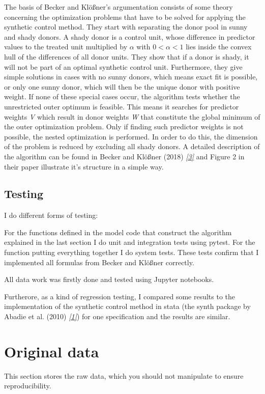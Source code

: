 \documentclass[a4paper,11pt,english]{sphinxmanual}
\begin{document}
The basis of Becker and Klößner's argumentation consists of some theory concerning the optimization problems that have to be solved for applying the synthetic control method. They start with separating the donor pool in sunny and shady donors. A shady donor is a control unit, whose difference in predictor values to the treated unit multiplied by \(\alpha\) with \(0<\alpha<1\) lies inside the convex hull of the differences of all donor units. They show that if a donor is shady, it will not be part of an optimal synthetic control unit. Furthermore, they give simple solutions in cases with no sunny donors, which means exact fit is possible, or only one sunny donor, which will then be the unique donor with positive weight. If none of these special cases occur, the algorithm tests whether the unrestricted outer optimum is feasible. This means it searches for predictor weights \emph{V} which result in donor weights \emph{W} that constitute the global minimum of the outer optimization problem. Only if finding such predictor weights is not possible, the nested optimization is performed. In order to do this, the dimension of the problem is reduced by excluding all shady donors. A detailed description of the algorithm can be found in Becker and Klößner (2018) \label{introduction:id9}{\hyperref[references:becker2018]{\emph{{[}3{]}}}} and Figure 2 in their paper illustrate it's structure in a simple way.


\section{Testing}
\label{introduction:testing}
I do different forms of testing:

For the functions defined in the model code that construct the algorithm explained in the last section I do unit and integration tests using pytest. For the function
putting everything together I do system tests.
These tests confirm that I implemented all formulas from Becker and Klößner correctly.

All data work was firstly done and tested using Jupyter notebooks.

Furtherore, as a kind of regression testing, I compared some results to the implementation of the synthetic control method in stata (the synth package by Abadie et al. (2010) \label{introduction:id10}{\hyperref[references:abadie2010]{\emph{{[}1{]}}}})
for one specification and the results are similar.


\chapter{Original data}
\label{original_data:id1}\label{original_data:original-data}\label{original_data::doc}
This section stores the raw data, which you should not manipulate to ensure reproducibility.
\end{document}
